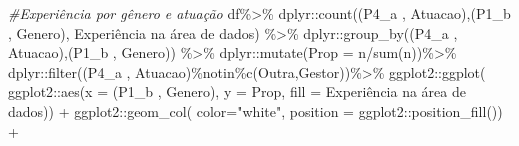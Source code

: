 \documentclass[
]{article}
\newenvironment{Shaded}{\begin{snugshade}}{\end{snugshade}}
\newcommand{\AttributeTok}[1]{\textcolor[rgb]{0.77,0.63,0.00}{#1}}
\newcommand{\CommentTok}[1]{\textcolor[rgb]{0.56,0.35,0.01}{\textit{#1}}}
\newcommand{\FunctionTok}[1]{\textcolor[rgb]{0.00,0.00,0.00}{#1}}
\newcommand{\NormalTok}[1]{#1}
\newcommand{\SpecialCharTok}[1]{\textcolor[rgb]{0.00,0.00,0.00}{#1}}
\newcommand{\StringTok}[1]{\textcolor[rgb]{0.31,0.60,0.02}{#1}}
\begin{document}
\begin{Shaded}
\begin{Highlighting}[]
\CommentTok{\#Experiência por gênero e atuação}
\NormalTok{df}\SpecialCharTok{\%\textgreater{}\%}
\NormalTok{  dplyr}\SpecialCharTok{::}\FunctionTok{count}\NormalTok{(}\StringTok{\textasciigrave{}}\AttributeTok{(\textquotesingle{}P4\_a \textquotesingle{}, \textquotesingle{}Atuacao\textquotesingle{})}\StringTok{\textasciigrave{}}\NormalTok{,}\StringTok{\textasciigrave{}}\AttributeTok{(\textquotesingle{}P1\_b \textquotesingle{}, \textquotesingle{}Genero\textquotesingle{})}\StringTok{\textasciigrave{}}\NormalTok{,}
               \StringTok{\textasciigrave{}}\AttributeTok{Experiência na área de dados}\StringTok{\textasciigrave{}}\NormalTok{) }\SpecialCharTok{\%\textgreater{}\%}
\NormalTok{  dplyr}\SpecialCharTok{::}\FunctionTok{group\_by}\NormalTok{(}\StringTok{\textasciigrave{}}\AttributeTok{(\textquotesingle{}P4\_a \textquotesingle{}, \textquotesingle{}Atuacao\textquotesingle{})}\StringTok{\textasciigrave{}}\NormalTok{,}\StringTok{\textasciigrave{}}\AttributeTok{(\textquotesingle{}P1\_b \textquotesingle{}, \textquotesingle{}Genero\textquotesingle{})}\StringTok{\textasciigrave{}}\NormalTok{) }\SpecialCharTok{\%\textgreater{}\%}
\NormalTok{  dplyr}\SpecialCharTok{::}\FunctionTok{mutate}\NormalTok{(}\AttributeTok{Prop =}\NormalTok{ n}\SpecialCharTok{/}\FunctionTok{sum}\NormalTok{(n))}\SpecialCharTok{\%\textgreater{}\%}
\NormalTok{  dplyr}\SpecialCharTok{::}\FunctionTok{filter}\NormalTok{(}\StringTok{\textasciigrave{}}\AttributeTok{(\textquotesingle{}P4\_a \textquotesingle{}, \textquotesingle{}Atuacao\textquotesingle{})}\StringTok{\textasciigrave{}}\SpecialCharTok{\%notin\%}\FunctionTok{c}\NormalTok{(}\StringTok{\textquotesingle{}Outra\textquotesingle{}}\NormalTok{,}\StringTok{\textquotesingle{}Gestor\textquotesingle{}}\NormalTok{))}\SpecialCharTok{\%\textgreater{}\%}
\NormalTok{  ggplot2}\SpecialCharTok{::}\FunctionTok{ggplot}\NormalTok{(}
\NormalTok{    ggplot2}\SpecialCharTok{::}\FunctionTok{aes}\NormalTok{(}\AttributeTok{x =} \StringTok{\textasciigrave{}}\AttributeTok{(\textquotesingle{}P1\_b \textquotesingle{}, \textquotesingle{}Genero\textquotesingle{})}\StringTok{\textasciigrave{}}\NormalTok{, }\AttributeTok{y =}\NormalTok{ Prop,}
                 \AttributeTok{fill =} \StringTok{\textasciigrave{}}\AttributeTok{Experiência na área de dados}\StringTok{\textasciigrave{}}\NormalTok{)) }\SpecialCharTok{+}
\NormalTok{  ggplot2}\SpecialCharTok{::}\FunctionTok{geom\_col}\NormalTok{( }\AttributeTok{color=}\StringTok{"white"}\NormalTok{,}
                     \AttributeTok{position =}\NormalTok{ ggplot2}\SpecialCharTok{::}\FunctionTok{position\_fill}\NormalTok{()) }\SpecialCharTok{+}

\end{Highlighting}
\end{Shaded}
\end{document}
